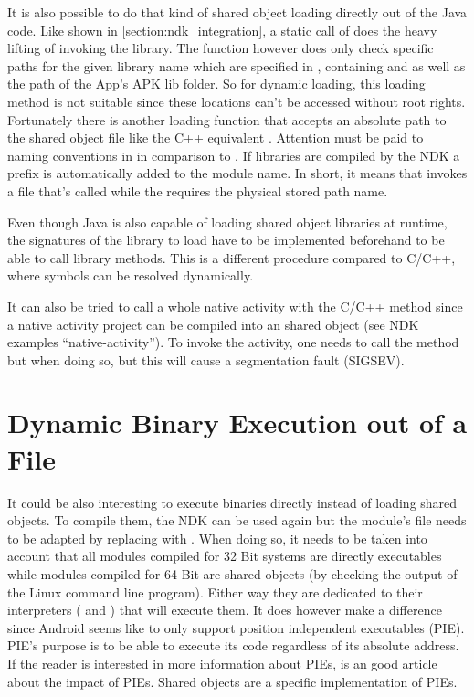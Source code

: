 It is also possible to do that kind of shared object loading directly out of the Java
code. Like shown in \autoref{section:ndk_integration}, a static call of
 does the heavy lifting of invoking the library.
The  function however does only check specific paths for the given
library name which are specified in , containing
 and  as well as the path of the App's APK lib
folder. So for dynamic loading, this loading method is not suitable since these
locations can't be accessed without root rights. Fortunately there is another
loading function  that accepts an absolute path to
the shared object file like the C++ equivalent . Attention must be
paid to naming conventions in  in comparison to . If libraries are compiled by the NDK a  prefix is automatically added to the module name.
In short, it means that  invokes a file
that's called  while the  requires the physical
stored path name.

Even though Java is also capable of loading shared object libraries at runtime, the
signatures of the library to load have to be implemented beforehand to be able to call
library methods. This is a different procedure compared to C/C++, where symbols can be resolved dynamically.

It can also be tried to call a whole native activity with the C/C++ method since
a native activity project can be compiled into an shared object (see NDK
examples ``native-activity''). To invoke the activity, one needs to call the
 method but when doing so, but this will cause
a segmentation fault (SIGSEV).


\section{Dynamic Binary Execution out of a File}\label{section:dyn_bin_exec}

It could be also interesting to execute binaries directly instead of loading shared objects. To compile them, the NDK can be used again but the module's
 file needs to be adapted by replacing  with . When doing so, it needs to be taken into account that all modules compiled for 32 Bit systems are directly executables while modules
compiled for 64 Bit are shared objects (by checking the output of the Linux
 command line program).
Either way they are dedicated to their interpreters ( and ) that will execute them. It does however make a difference since
Android seems like to only support position independent executables (PIE).
PIE's purpose is to be able to execute its code regardless of its absolute address. If the reader is interested in more information about PIEs,
\parencite{pie} is an good article about the impact of PIEs.
Shared objects are a specific implementation of PIEs.

